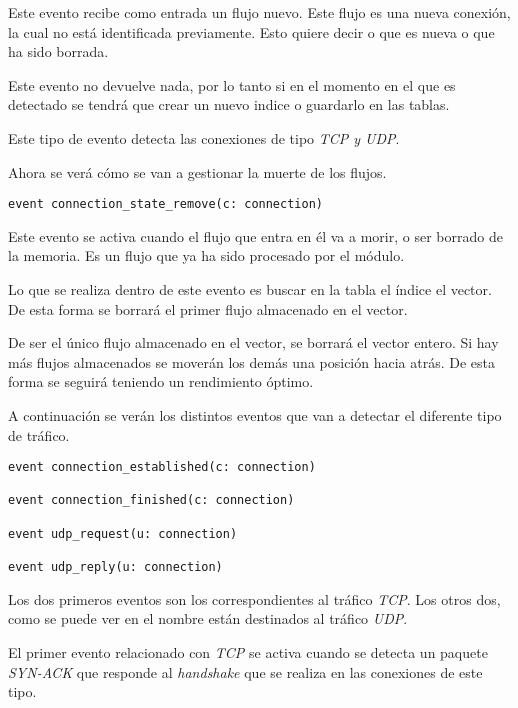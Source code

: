 \intro Este evento recibe como entrada un flujo nuevo. Este flujo es una nueva conexión, la cual no está identificada 
previamente. Esto quiere decir o que es nueva o que ha sido borrada.

\intro Este evento no devuelve nada, por lo tanto si en el momento en el que es detectado se tendrá que crear un nuevo 
indice o guardarlo en las tablas.

\intro Este tipo de evento detecta las conexiones de tipo \textit{TCP y UDP}.

\intro Ahora se verá cómo se van a gestionar la muerte de los flujos.

\begin{lstlisting}[style=CodigoC]
event connection_state_remove(c: connection)

\end{lstlisting}

\intro Este evento se activa cuando el flujo que entra en él va a morir, o ser borrado de la memoria. Es un flujo 
que ya ha sido procesado por el módulo.

\intro Lo que se realiza dentro de este evento es buscar en la tabla el índice el vector. De esta forma 
se borrará el primer flujo almacenado en el vector.

\intro De ser el único flujo almacenado en el vector, se borrará el vector entero. Si hay más flujos almacenados 
se moverán los demás una posición hacia atrás. De esta forma se seguirá teniendo un rendimiento óptimo.

\intro A continuación se verán los distintos eventos que van a detectar el diferente tipo de tráfico.

\begin{lstlisting}[style=CodigoC]
event connection_established(c: connection)

event connection_finished(c: connection)

event udp_request(u: connection)

event udp_reply(u: connection)

\end{lstlisting}

\intro Los dos primeros eventos son los correspondientes al tráfico \textit{TCP}. Los otros dos, como se puede ver 
en el nombre están destinados al tráfico \textit{UDP}.

\intro El primer evento relacionado con \textit{TCP} se activa cuando se detecta un paquete \textit{SYN-ACK} que 
responde al \textit{handshake} que se realiza en las conexiones de este tipo.

